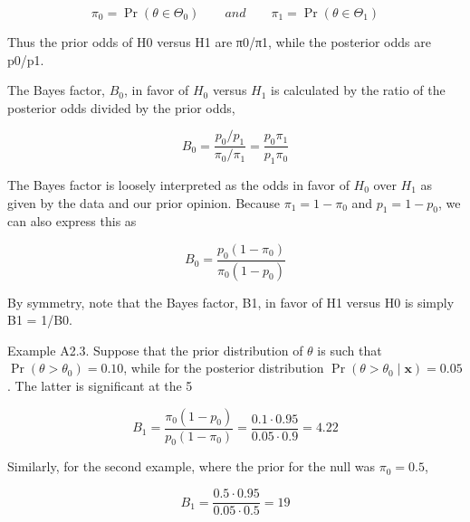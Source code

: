 \documentclass{article}
\begin{document}
\begin{equation}
\pi_{0}=\Pr(\theta\in\Theta_{0})\qquad and\qquad\pi_{1}=\Pr(\theta\in\Theta_{1})
\end{equation}

Thus the prior odds of H0 versus H1 are π0/π1, while the posterior odds are p0/p1.

The Bayes factor,  $ B_{0} $, in favor of  $ H_{0} $ versus  $ H_{1} $ is calculated by the ratio of the posterior odds divided by the prior odds,

\begin{equation}
B_{0}=\frac{p_{0}/p_{1}}{\pi_{0}/\pi_{1}}=\frac{p_{0}\pi_{1}}{p_{1}\pi_{0}}
\end{equation}

The Bayes factor is loosely interpreted as the odds in favor of  $ H_0 $ over  $ H_1 $ as given by the data and our prior opinion. Because  $ \pi_1 = 1 - \pi_0 $ and  $ p_1 = 1 - p_0 $, we can also express this as

\begin{equation}
B_{0}=\frac{p_{0}(1-\pi_{0})}{\pi_{0}(1-p_{0})}
\end{equation}

By symmetry, note that the Bayes factor, B1, in favor of H1 versus H0 is simply B1 = 1/B0.

Example A2.3. Suppose that the prior distribution of  $ \theta $ is such that  $ \Pr(\theta > \theta_0) = 0.10 $, while for the posterior distribution  $ \Pr(\theta > \theta_0 \mid \mathbf{x}) = 0.05 $. The latter is significant at the 5%

\begin{equation}
B_{1}=\frac{\pi_{0}(1-p_{0})}{p_{0}(1-\pi_{0})}=\frac{0.1\cdot0.95}{0.05\cdot0.9}=4.22
\end{equation}

Similarly, for the second example, where the prior for the null was  $ \pi_{0}=0.5 $,

\begin{equation}
B_{1}=\frac{0.5\cdot0.95}{0.05\cdot0.5}=19
\end{equation}
\end{document}
